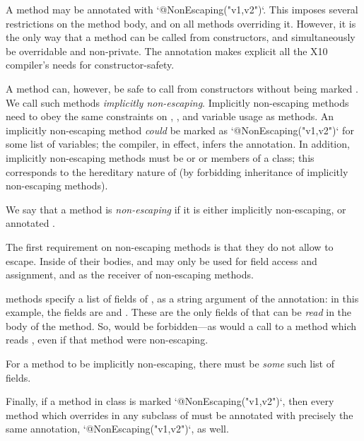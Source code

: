 A method may be annotated with \xcd`@NonEscaping("v1,v2")`.  This
imposes several restrictions on the method body, and on all methods overriding
it.  However, it is the only way that a method can be called from
constructors, and simultaneously be overridable and non-private.  The
 annotation makes explicit all the X10 compiler's needs for
constructor-safety.  

A method can, however, be safe to call from constructors without being marked
. We call such methods {\em implicitly non-escaping}.
Implicitly non-escaping methods need to obey the same constraints on
, , and variable usage as  methods. An
implicitly non-escaping method {\em could} be marked as
\xcd`@NonEscaping("v1,v2")` for some list of variables; the compiler, in
effect, infers the annotation. In addition, implicitly non-escaping methods
must be  or  or members of a  class; this
corresponds to the hereditary nature of  (by forbidding
inheritance of implicitly non-escaping methods).

We say that a method is {\em non-escaping} if it is either implicitly
non-escaping, or annotated .

The first requirement on non-escaping methods is that they do not allow
 to escape. Inside of their bodies,  and  may
only be used for field access and assignment, and as the receiver of
non-escaping methods.

 methods specify a list of fields of , as
a string argument of the annotation: in this example, the fields are 
and .  These are the only fields of  that can be {\em read}
in the body of the method.  So,  would be forbidden---as
would a call to a method which reads , even if that method were
non-escaping. 

For a method to be implicitly non-escaping, there must be {\em some} such list
of fields.  

Finally, if a method  in class  is marked
\xcd`@NonEscaping("v1,v2")`, then every method which overrides  in any
subclass of  must be annotated with precisely the same annotation,
\xcd`@NonEscaping("v1,v2")`, as well.  

